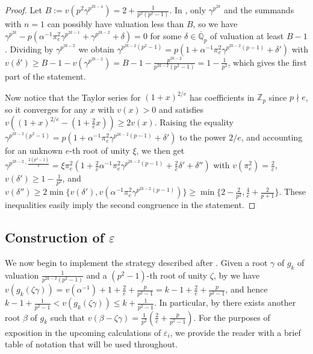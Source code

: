 \documentclass{amsart}
\theoremstyle{definition}
\newcommand{\Z}{\mathbb{Z}}
\newcommand{\Q}{\mathbb{Q}}
\numberwithin{theorem}{section}
\numberwithin{equation}{section}
\begin{document}
\begin{proof}
Let $B := v(p^2 \gamma^{p^{2k-4}}) = 2 + \frac{1}{p^2(p^2-1)}$. In , only $\gamma^{p^{2k}}$ and the summands with $n=1$ can possibly have valuation less than $B$, so we have
$
\gamma^{p^{2k}} - p \left( \alpha^{-1} \pi_e^2 \gamma^{p^{2k-1}} + \gamma^{p^{2k-2}} + \delta \right)=0
$
for some $\delta \in \overline{\Q}_p$ of valuation at least $B-1$. Dividing by $\gamma^{p^{2k-2}}$ we obtain $\gamma^{p^{2k-2}(p^2-1)} = p \left( 1+ \alpha^{-1} \pi_e^2 \gamma^{p^{2k-2}(p-1)}  + \delta' \right)$ with $v(\delta') \geq B-1 - v(\gamma^{p^{2k-2}}) = B-1- \frac{p^{2k-2}}{p^{2k-2}(p^2-1)}=1-\frac{1}{p^2}$, which gives the first part of the statement.

Now notice that the Taylor series for $(1+x)^{2/e}$ has coefficients in $\Z_p$ since $p \nmid e$, so it converges for any $x$ with $v(x) > 0$ and satisfies $v\left((1+x)^{2/e} - \left(1 + \frac{2}{e}x\right)\right) \geq 2 v(x)$. Raising the equality $\gamma^{p^{2k-2}(p^2-1)} = p \left( 1+ \alpha^{-1} \pi_e^2 \gamma^{p^{2k-2}(p-1)}  + \delta' \right)$ to the power $2/e$, and accounting for an unknown $e$-th root of unity $\xi$, we then get $\gamma^{p^{2k-2} \cdot\frac{2(p^2-1)}{e}} = \xi \pi_e^2 \left( 1+ \frac{2}{e} \alpha^{-1} \pi_e^2 \gamma^{p^{2k-2}(p-1)}  + \frac{2}{e}\delta' + \delta'' \right)$ with $v(\pi_e^2) = \frac{2}{e}$, $v(\delta') \geq 1-\frac{1}{p^2}$, and $v(\delta'') \geq 2\min \{ v(\delta'), v\left(\alpha^{-1} \pi_e^2 \gamma^{p^{2k-2}(p-1)}\right) \} \geq \min\{2-\frac{2}{p^2}  ,\frac{4}{e} + \frac{2}{p+1} \}$.
These inequalities easily imply the second congruence in the statement.
\end{proof}


\subsection{Construction of $\varepsilon$}
We now begin to implement the strategy described after . 
Given a root $\gamma$ of $g_k$ of valuation $\frac{1}{p^{2k-2}(p^2-1)}$ and a $(p^2-1)$-th root of unity $\zeta$, by  we have $v(g_k(\zeta\gamma)) = v(\alpha^{-1}) + 1 + \frac{2}{e} + \frac{p}{p^2-1} = k-1 +\frac{2}{e} + \frac{p}{p^2-1}$, and hence $k-1+\frac{1}{p^2-1} < v(g_k(\zeta\gamma)) \le k + \frac{1}{p^2-1}$. In particular, by  there exists another root $\beta$ of $g_k$ such that $v(\beta- \zeta\gamma) = \frac{1}{p^2}\left( \frac{2}{e} + \frac{p}{p^2-1} \right)$.
For the purposes of exposition in the upcoming calculations of $\varepsilon_i$, we provide the reader with a brief table of notation that will be used throughout.
\end{document}
